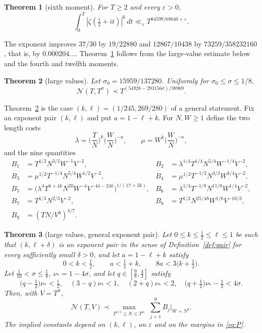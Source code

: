\documentclass[11pt]{amsart}
\newtheorem{theorem}{Theorem}[section]
\theoremstyle{definition}
\theoremstyle{remark}
\numberwithin{equation}{section}
\newcommand{\cN}{\mathcal{N}}
\begin{document}
\begin{theorem}[sixth moment]\label{thm:sixth}
For $T\ge2$ and every $\varepsilon>0$,
\[
\int_0^T|\zeta(\tfrac12+it)|^6\,dt\ll_\varepsilon T^{84599/68640+\varepsilon}.
\]
\end{theorem}

The exponent improves $37/30$ by $19/22880$ and $12867/10438$ by $73259/358232160$, that is, by $0.000204\ldots$. Theorem~\ref{thm:sixth} follows from the large-value estimate below and the fourth and twelfth moments.

\begin{theorem}[large values]\label{thm:large}
Let $\sigma_0=15959/137280$. Uniformly for $\sigma_0\le\sigma\le1/8$,
\[
\cN(T,T^\sigma)\prec T^{(54928-293156\sigma)/38969}.
\]
\end{theorem}

Theorem~\ref{thm:large} is the case $(k,\ell)=(1/245,269/280)$ of a general statement. Fix an exponent pair $(k,\ell)$ and put $a=1-\ell+k$. For $N,W\ge1$ define the two length costs
\begin{equation}\label{eq:lammu}
\lambda=\Big(\frac TN\Big)^{k}\Big(\frac WN\Big)^{-a},\qquad
\mu=W^{k}\Big(\frac WN\Big)^{-a},
\end{equation}
and the nine quantities
\begin{equation}\label{eq:nine}
\begin{aligned}
B_1&=T^{1/2}N^{3/2}W^{-1}V^{-2}, &
B_2&=\lambda^{1/4}T^{1/4}N^{5/4}W^{-1/4}V^{-2},\\
B_3&=\mu^{1/2}T^{-1/4}N^{5/4}W^{1/2}V^{-2}, &
B_4&=\mu^{1/2}T^{-1/2}N^{3/2}W^{3/4}V^{-2},\\
B_5&=\big(\lambda^{4}T^{6+4k}N^{20}W^{-4}V^{-44-24k}\big)^{1/(17+2k)}, &
B_6&=\lambda^{1/4}T^{-1/8}N^{11/8}W^{1/4}V^{-2},\\
B_7&=T^{1/3}N^{2/3}V^{-2}, &
B_8&=T^{1/2}N^{25/48}W^{1/6}V^{-10/3},\\
B_9&=(TN/V^{6})^{4/7}.
\end{aligned}
\end{equation}

\begin{theorem}[large values, general exponent pair]\label{thm:general}
Let $0\le k\le\frac12\le\ell\le1$ be such that $(k,\ell+\delta)$ is an exponent pair in the sense of Definition~\ref{def:pair} for every sufficiently small $\delta>0$, and let $a=1-\ell+k$ satisfy
\begin{equation}\label{eq:H}
0<k<\tfrac12,\qquad a<\tfrac12+k,\qquad 8a<3\big(k+\tfrac12\big).
\end{equation}
Let $\frac1{10}<\sigma\le\frac18$, $\nu_*=1-4\sigma$, and let $q\in[\frac98,\frac43]$ satisfy
\begin{equation}\label{eq:P}
\big(q-\tfrac12\big)\nu_*<\tfrac12,\quad
(3-q)\nu_*<1,\quad
(2+q)\nu_*<2,\quad
\big(q+\tfrac12\big)\nu_*-\tfrac12<4\sigma .
\end{equation}
Then, with $V=T^\sigma$,
\[
\cN(T,V)\prec\max_{T^{1/3}\le N\le T^{\nu_*}}\ \sum_{j=1}^{9}B_j\big|_{W=N^{q}} .
\]
The implied constants depend on $(k,\ell)$, on $\varepsilon$ and on the margins in \eqref{eq:P}.
\end{theorem}
\end{document}
